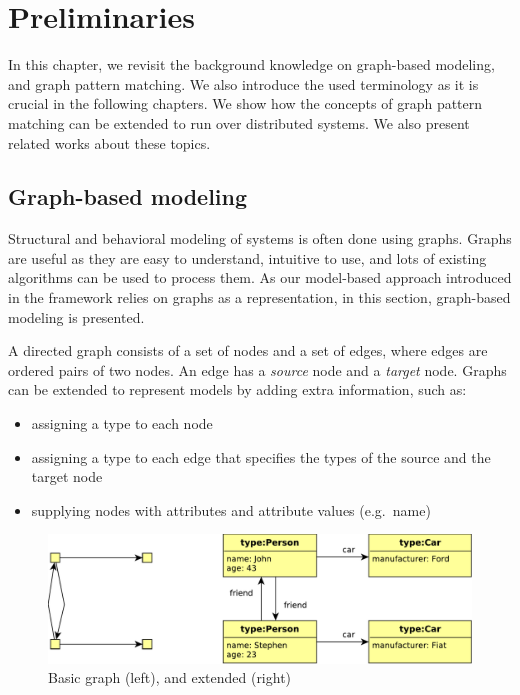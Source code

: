 
\chapter{Preliminaries}

In this chapter, we revisit the background knowledge on graph-based modeling, and graph pattern matching. We also introduce the used terminology as it is crucial in the following chapters. We show how the concepts of graph pattern matching can be extended to run over distributed systems. We also present related works about these topics.

\section{Graph-based modeling}

Structural and behavioral modeling of systems is often done using graphs. 
Graphs are useful as they are easy to understand, intuitive to use, and lots of existing algorithms can be used to process them. 
As our model-based approach introduced in the framework relies on graphs as a representation, in this section, graph-based modeling is presented.

A directed graph consists of a set of nodes and a set of edges, where edges are ordered pairs of two nodes. An edge has a \emph{source} node and a \emph{target} node. 
Graphs can be extended to represent models by adding extra information, such as:
\begin{itemize}
	\item assigning a type to each node
	\item assigning a type to each edge that specifies the types of the source and the target node
	\item supplying nodes with attributes and attribute values (e.g.\ name)
\end{itemize}


\begin{figure}[H]
	\begin{center}
		\includegraphics[width=\textwidth]{figures/graphs.pdf}
		\caption{Basic graph (left), and extended (right) }
		\label{fig:graphs}
	\end{center}
\end{figure}

